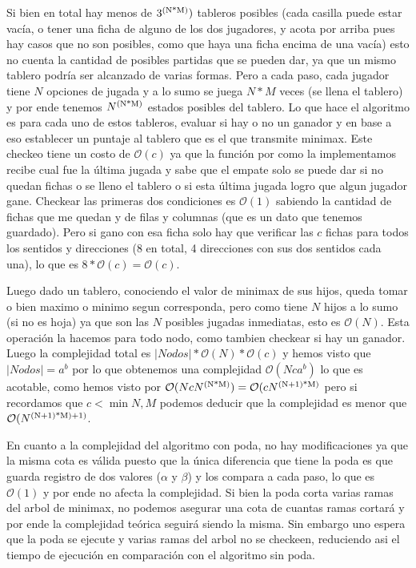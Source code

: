 \documentclass[A4paper,oneside,fleqn,11pt]{article}
\theoremstyle{definition}
\begin{document}
Si bien en total hay  menos de $3\textsuperscript{(N*M)})$ tableros posibles (cada casilla puede estar vacía, o tener una ficha de alguno de los dos jugadores, y acota por arriba pues hay casos que no son posibles, como que haya una ficha encima de una vacía) esto no cuenta la cantidad de posibles partidas que se pueden dar, ya que un mismo tablero podría ser alcanzado de varias formas. Pero a cada paso, cada jugador tiene $N$ opciones de jugada y a lo sumo se juega $N*M$ veces (se llena el tablero) y por ende tenemos $N\textsuperscript{(N*M)}$ estados posibles del tablero. Lo que hace el algoritmo es para cada uno de estos tableros, evaluar si hay o no un ganador y en base a eso establecer un puntaje al tablero que es el que transmite minimax. Este checkeo tiene un costo de $\mathcal{O}(c)$ ya que la función por como la implementamos recibe cual fue la última jugada y sabe que el empate solo se puede dar si no quedan fichas o se lleno el tablero o si esta última jugada logro que algun jugador gane. Checkear las primeras dos condiciones es $\mathcal{O}(1)$ sabiendo la cantidad de fichas que me quedan y de filas y columnas (que es un dato que tenemos guardado). Pero si gano con esa ficha solo hay que verificar las $c$ fichas para todos los sentidos y direcciones (8 en total, 4 direcciones con sus dos sentidos cada una), lo que es $8* \mathcal{O}(c)= \mathcal{O}(c)$. 

Luego dado un tablero, conociendo el valor de minimax de sus hijos, queda tomar o bien maximo o minimo segun corresponda, pero como tiene $N$ hijos a lo sumo (si no es hoja) ya que son las $N$ posibles jugadas inmediatas, esto es $\mathcal{O}(N)$. Esta operación la hacemos para todo nodo, como tambien checkear si hay un ganador. Luego la complejidad total es $|Nodos|*\mathcal{O}(N)*\mathcal{O}(c)$ y hemos visto que $|Nodos|=a^b$ por lo que obtenemos una complejidad $\mathcal{O}(N c a^b)$ lo que es acotable, como hemos visto por $\mathcal{O}(N c N\textsuperscript{(N*M)})=\mathcal{O}(c N\textsuperscript{(N+1)*M)}$ pero si recordamos que $c<\min{N,M}$ podemos deducir que la complejidad es menor que $\mathcal{O}(N\textsuperscript{(N+1)*M)+1)}$.

En cuanto a la complejidad del algoritmo con poda, no hay modificaciones ya que la misma cota es válida puesto que la única diferencia que tiene la poda es que guarda registro de dos valores ($\alpha$ y $\beta$) y los compara a cada paso, lo que es $\mathcal{O}(1)$ y por ende no afecta la complejidad. Si bien la poda corta varias ramas del arbol de minimax, no podemos asegurar una cota de cuantas ramas cortará y por ende la complejidad teórica seguirá siendo la misma. Sin embargo uno espera que la poda se ejecute y varias ramas del arbol no se checkeen, reduciendo asi el tiempo de ejecución en comparación con el algoritmo sin poda.
\end{document}
